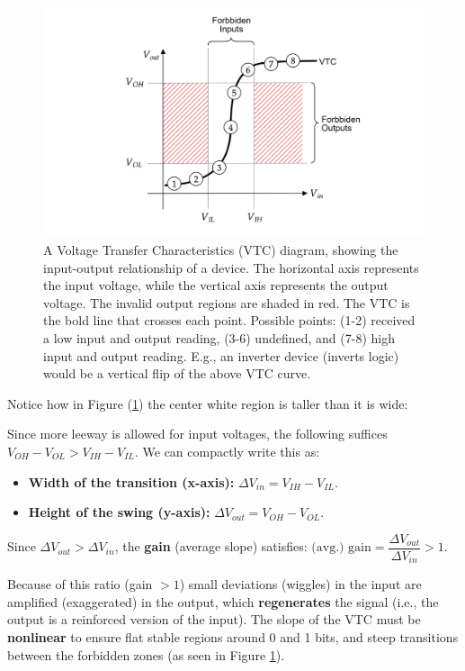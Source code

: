     \begin{figure}[ht!]

        \centering
        \includegraphics[width=\textwidth]{./Sections/circuits/vtc.png}
        \caption{A Voltage Transfer Characteristics (VTC) diagram, showing the input-output relationship of a device. 
        The horizontal axis represents the input voltage, while the vertical axis represents the output voltage. 
        The invalid output regions are shaded in red. The VTC is the bold line that crosses each point. Possible points: (1-2) received a
        low input and output reading, (3-6) undefined, and (7-8) high input and output reading. E.g., an inverter device (inverts logic) would be a vertical flip of the above VTC curve.}
        \label{fig:vtc}
    \end{figure}

    \noindent
    Notice how in Figure (\ref{fig:vtc}) the center white region is taller than it is wide:
    \begin{theo}

    \label{theo:vtc_gain_nonlinearity}
    \noindent
    Since more leeway is allowed for input voltages, the following suffices $V_{OH} - V_{OL} > V_{IH} - V_{IL}$.
    We can compactly write this as:
    \begin{itemize}
        \item \textbf{Width of the transition (x-axis):} 
        $\Delta V_{in} = V_{IH} - V_{IL}$.
        \item \textbf{Height of the swing (y-axis):} 
        $\Delta V_{out} = V_{OH} - V_{OL}$.
    \end{itemize}

    \noindent
    Since $\Delta V_{out} > \Delta V_{in}$, the \textbf{gain} (average slope) satisfies:
    $
        \text{(avg.) gain}
        = \dfrac{\Delta V_{out}}{\Delta V_{in}}
        > 1.
    $

    \medskip

    \noindent
    Because of this ratio (gain $> 1$) small deviations (wiggles) in the input are amplified (exaggerated) in the output,
    which \textbf{regenerates} the signal (i.e., the output is a reinforced version of the input). The slope of the VTC
    must be \textbf{nonlinear} to ensure flat stable regions around 0 and 1 bits, and steep transitions between the forbidden zones (as seen in Figure \ref{fig:vtc}).
    \end{theo}
